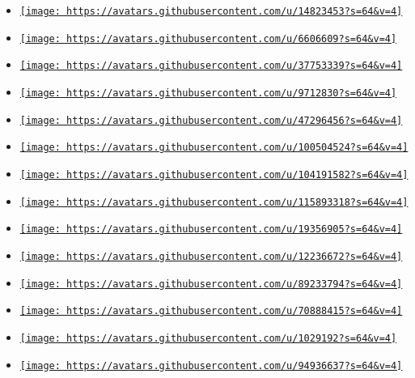 \begin{itemize}
\item
  \href{https://github.com/HydroH}{\texttt{[image: https://avatars.githubusercontent.com/u/14823453?s=64\&v=4]}}
\item
  \href{https://github.com/JHenneberg}{\texttt{[image: https://avatars.githubusercontent.com/u/6606609?s=64\&v=4]}}
\item
  \href{https://github.com/Jacobgarm}{\texttt{[image: https://avatars.githubusercontent.com/u/37753339?s=64\&v=4]}}
\item
  \href{https://github.com/Jocs}{\texttt{[image: https://avatars.githubusercontent.com/u/9712830?s=64\&v=4]}}
\item
  \href{https://github.com/JonPichel}{\texttt{[image: https://avatars.githubusercontent.com/u/47296456?s=64\&v=4]}}
\item
  \href{https://github.com/JustForFun88}{\texttt{[image: https://avatars.githubusercontent.com/u/100504524?s=64\&v=4]}}
\item
  \href{https://github.com/LingkKang}{\texttt{[image: https://avatars.githubusercontent.com/u/104191582?s=64\&v=4]}}
\item
  \href{https://github.com/Lucy-73}{\texttt{[image: https://avatars.githubusercontent.com/u/115893318?s=64\&v=4]}}
\item
  \href{https://github.com/LuxxxLucy}{\texttt{[image: https://avatars.githubusercontent.com/u/19356905?s=64\&v=4]}}
\item
  \href{https://github.com/NiklasEi}{\texttt{[image: https://avatars.githubusercontent.com/u/12236672?s=64\&v=4]}}
\item
  \href{https://github.com/Orange149}{\texttt{[image: https://avatars.githubusercontent.com/u/89233794?s=64\&v=4]}}
\item
  \href{https://github.com/QuarticCat}{\texttt{[image: https://avatars.githubusercontent.com/u/70888415?s=64\&v=4]}}
\item
  \href{https://github.com/SillyFreak}{\texttt{[image: https://avatars.githubusercontent.com/u/1029192?s=64\&v=4]}}
\item
  \href{https://github.com/T1mVo}{\texttt{[image: https://avatars.githubusercontent.com/u/94936637?s=64\&v=4]}}

\end{itemize}
